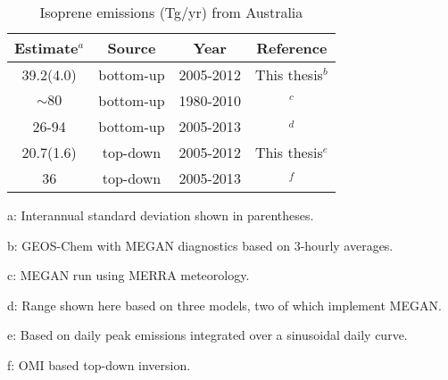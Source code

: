     
    
    
    
    \begin{table}\begin{threeparttable}
      \caption{Isoprene emissions (Tg/yr) from Australia}
      \begin{tabular}{ c c c c } 
        \toprule
        Estimate$^{a}$ & Source & Year & Reference \\
        \midrule
        39.2(4.0) & bottom-up & 2005-2012 & This thesis$^{b}$ \\ %
        $\sim 80$ & bottom-up & 1980-2010 & \textcite{Sindelarova2014}$^{c}$ \\ %
        26-94 & bottom-up & 2005-2013 & \textcite{Bauwens2016}$^{d}$ \\
        20.7(1.6) & top-down & 2005-2012 & This thesis$^{e}$ \\
        36 & top-down & 2005-2013 & \textcite{Bauwens2016}$^{f}$ \\
        \bottomrule
      \end{tabular}
      \begin{tablenotes} 
        \small
        \item a: Interannual standard deviation shown in parentheses.
        \item b: GEOS-Chem with MEGAN diagnostics based on 3-hourly averages. 
        \item c: MEGAN run using MERRA meteorology.  
        \item d: Range shown here based on three models, two of which implement MEGAN.
        \item e: Based on daily peak emissions integrated over a sinusoidal daily curve. 
        \item f: OMI based top-down inversion.
      \end{tablenotes}
      \label{BioIsop:results:emissions:tab_emissions_Tg}
    \end{threeparttable}\end{table}
    
